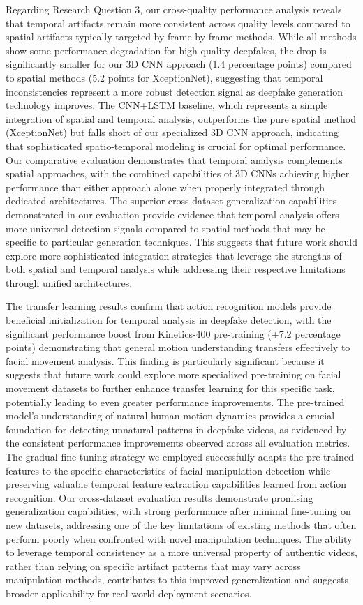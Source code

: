 \documentclass[conference]{IEEEtran}
\begin{document}
Regarding Research Question 3, our cross-quality performance analysis reveals that temporal artifacts remain more consistent across quality levels compared to spatial artifacts typically targeted by frame-by-frame methods.
While all methods show some performance degradation for high-quality deepfakes, the drop is significantly smaller for our 3D CNN approach (1.4 percentage points) compared to spatial methods (5.2 points for XceptionNet), suggesting that temporal inconsistencies represent a more robust detection signal as deepfake generation technology improves.
The CNN+LSTM baseline, which represents a simple integration of spatial and temporal analysis, outperforms the pure spatial method (XceptionNet) but falls short of our specialized 3D CNN approach, indicating that sophisticated spatio-temporal modeling is crucial for optimal performance.
Our comparative evaluation demonstrates that temporal analysis complements spatial approaches, with the combined capabilities of 3D CNNs achieving higher performance than either approach alone when properly integrated through dedicated architectures.
The superior cross-dataset generalization capabilities demonstrated in our evaluation provide evidence that temporal analysis offers more universal detection signals compared to spatial methods that may be specific to particular generation techniques.
This suggests that future work should explore more sophisticated integration strategies that leverage the strengths of both spatial and temporal analysis while addressing their respective limitations through unified architectures.

The transfer learning results confirm that action recognition models provide beneficial initialization for temporal analysis in deepfake detection, with the significant performance boost from Kinetics-400 pre-training (+7.2 percentage points) demonstrating that general motion understanding transfers effectively to facial movement analysis.
This finding is particularly significant because it suggests that future work could explore more specialized pre-training on facial movement datasets to further enhance transfer learning for this specific task, potentially leading to even greater performance improvements.
The pre-trained model's understanding of natural human motion dynamics provides a crucial foundation for detecting unnatural patterns in deepfake videos, as evidenced by the consistent performance improvements observed across all evaluation metrics.
The gradual fine-tuning strategy we employed successfully adapts the pre-trained features to the specific characteristics of facial manipulation detection while preserving valuable temporal feature extraction capabilities learned from action recognition.
Our cross-dataset evaluation results demonstrate promising generalization capabilities, with strong performance after minimal fine-tuning on new datasets, addressing one of the key limitations of existing methods that often perform poorly when confronted with novel manipulation techniques.
The ability to leverage temporal consistency as a more universal property of authentic videos, rather than relying on specific artifact patterns that may vary across manipulation methods, contributes to this improved generalization and suggests broader applicability for real-world deployment scenarios.
\end{document}
